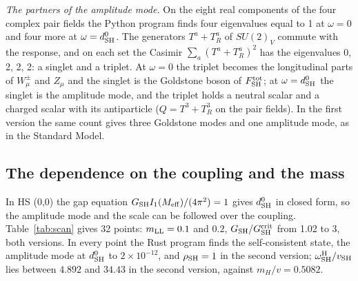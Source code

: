 \documentclass[aps,prd,onecolumn,superscriptaddress,nofootinbib,floatfix,longbibliography]{revtex4-2}
\newcommand{\LL}{{\rm LL}}
\newcommand{\SH}{{\rm SH}}
\begin{document}
\emph{The partners of the amplitude mode.} On the eight real components of the four complex pair fields the Python
program finds four eigenvalues equal to 1 at $\omega=0$ and four more at $\omega=d^0_\SH$. The generators $T^a+T^a_R$ of
$SU(2)_V$ commute with the response, and on each set the Casimir $\sum_a(T^a+T^a_R)^2$ has the eigenvalues 0, 2, 2, 2: a
singlet and a triplet. At $\omega=0$ the triplet becomes the longitudinal parts of $W^\pm_\mu$ and $Z_\mu$ and the singlet is
the Goldstone boson of $F^{\rm tot}_\SH$; at $\omega=d^0_\SH$ the singlet is the amplitude mode, and the triplet holds a
neutral scalar and a charged scalar with its antiparticle ($Q=T^3+T^3_R$ on the pair fields). In the first version the
same count gives three Goldstone modes and one amplitude mode, as in the Standard Model.

\subsection{The dependence on the coupling and the mass}

In HS (0,0) the gap equation $G_\SH I_1(M_{\rm eff})/(4\pi^2)=1$ gives $d^0_\SH$ in closed form, so the amplitude mode and the
scale can be followed over the coupling. Table~\ref{tab:scan} gives 32 points: $m_\LL=0.1$ and $0.2$,
$G_\SH/G^{\rm crit}_\SH$ from 1.02 to 3, both versions. In every point the Rust program finds the self-consistent state, the
amplitude mode at $d^0_\SH$ to \ensuremath{2\times10^{-12}}, and $\rho_\SH=1$ in the second version; $\omega^{\rm H}_\SH/v_\SH$ lies between
\ensuremath{4.892} and \ensuremath{34.43} in the second version, against $m_H/v=0.5082$.
\end{document}
